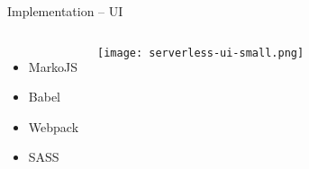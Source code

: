 \begin{frame}{Implementation -- UI}
  \begin{columns}
      \begin{itemize}
        \item MarkoJS
        \item Babel
        \item Webpack
        \item SASS
      \end{itemize}
      \vfill
      \centering
      \texttt{[image: serverless-ui-small.png]}
   \end{columns}
\end{frame}
